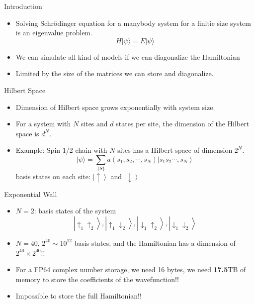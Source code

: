 \documentclass{beamer}
\begin{document}
\begin{frame}{Introduction}
    \begin{itemize}
        \item Solving Schr\"{o}dinger equation for a manybody system for a finitie size system is an eigenvalue problem.
        \[
        H|\psi\rangle=E|\psi\rangle
        \]
        \item We can simulate all kind of models if we can diagonalize the Hamiltonian
        \item Limited by the size of the matrices we can store and diagonalize. 
    \end{itemize}
\end{frame}
\begin{frame}{Hilbert Space}
    \begin{itemize}
    \item Dimension of Hilbert space grows exponentially with system size.
    \item For a system with $N$ sites and $d$ states per site, the dimension of the Hilbert space is $d^N$.
    \item Example: Spin-1/2 chain with $N$ sites has a Hilbert space of dimension $2^N$.
 $$
|\psi\rangle=\sum_{\{S\}} a\left(s_1, s_2, \cdots, s_N\right)\left|s_1 s_2 \cdots, s_N\right\rangle
$$
basis states on each site: $\left|\uparrow\right\rangle$ and $\left|\downarrow\right\rangle$

    \end{itemize}
\end{frame}
\begin{frame}{Exponential Wall}
    \begin{itemize}
        \item $N=2$: basis states of the system
        \[
        \left|\uparrow_1\uparrow_2\right\rangle, \left|\uparrow_1\downarrow_2\right\rangle, \left|\downarrow_1\uparrow_2\right\rangle, \left|\downarrow_1\downarrow_2\right\rangle
        \]
        \item $N=40$, $2^40 \sim 10^{12}$ basis states, and the Hamiltonian has a dimension of $2^40\times 2^40$!!
        \item For a FP64 complex number storage, we need 16 bytes, we need \textbf{17.5}TB of memory to store the coefficients of the wavefunction!!
        \item Impossible to store the full Hamiltonian!!
    \end{itemize}
\end{frame}
\end{document}
